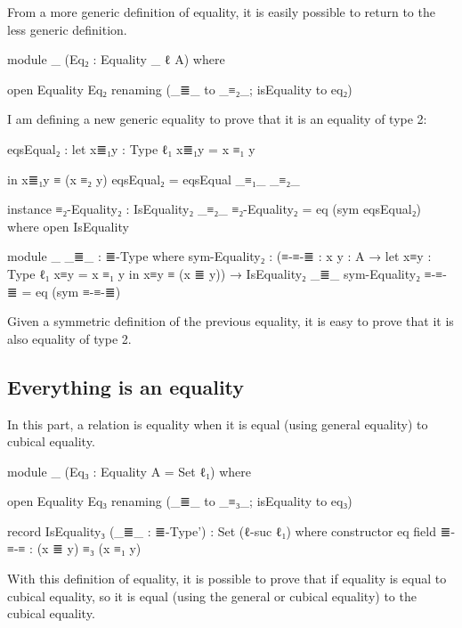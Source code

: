 \documentclass{article}
\begin{document}
From a more generic definition of equality,
it is easily possible to return to the less generic definition.

\begin{code}
    module _
      (Eq₂ : Equality {_} {ℓ} {A})
      where

      open Equality Eq₂ renaming (_≣_ to _≡₂_; isEquality to eq₂)
\end{code}

I am defining a new generic equality to prove that it is
an equality of type 2:

\begin{code}
      eqsEqual₂ : let
        x≣₁y : Type ℓ₁
        x≣₁y = x ≡₁ y

        in x≣₁y ≡ (x ≡₂ y)
      eqsEqual₂ = eqsEqual _≡₁_ _≡₂_

      instance
        ≡₂-Equality₂ : IsEquality₂ _≡₂_
        ≡₂-Equality₂ = eq (sym eqsEqual₂)
          where open IsEquality

      module _ {_≣_ : ≣-Type} where
        sym-Equality₂ : (≡-≡-≣ : {x y : A} → let
          x≡y : Type ℓ₁
          x≡y = x ≡₁ y
          in x≡y ≡ (x ≣ y))
          → IsEquality₂ _≣_
        sym-Equality₂ ≡-≡-≣ = eq (sym ≡-≡-≣)

\end{code}

Given a symmetric definition of the previous equality,
it is easy to prove that it is also equality of type 2.

\subsection{Everything is an equality}

In this part, a relation is equality when it is equal (using general equality) to cubical equality.

\begin{code}

    module _
      (Eq₃ : Equality {A = Set ℓ₁})
      where

      open Equality Eq₃ renaming (_≣_ to _≡₃_; isEquality to eq₃)

      record IsEquality₃ (_≣_ : ≣-Type') : Set (ℓ-suc ℓ₁) where
        constructor eq
        field
          ≣-≡-≡ : (x ≣ y) ≡₃ (x ≡₁ y)
\end{code}

With this definition of equality, it is possible to prove that if equality is equal to cubical equality,
so it is equal (using the general or cubical equality) to the cubical equality.
\end{document}
